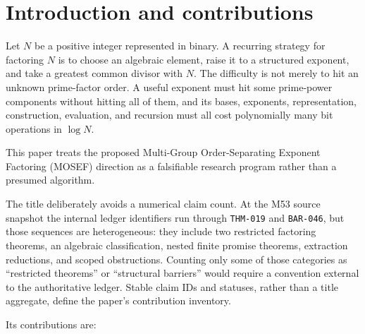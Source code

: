 \documentclass[11pt]{article}
\begin{document}
\section{Introduction and contributions}

Let \(N\) be a positive integer represented in binary. A recurring strategy
for factoring \(N\) is to choose an algebraic element, raise it to a structured
exponent, and take a greatest common divisor with \(N\). The difficulty is not
merely to hit an unknown prime-factor order. A useful exponent must hit some
prime-power components without hitting all of them, and its bases, exponents,
representation, construction, evaluation, and recursion must all cost
polynomially many bit operations in \(\log N\).

This paper treats the proposed Multi-Group Order-Separating Exponent Factoring
(MOSEF) direction as a falsifiable research program rather than a presumed
algorithm.

The title deliberately avoids a numerical claim count. At the M53 source
snapshot the internal ledger identifiers run through \texttt{THM-019} and
\texttt{BAR-046}, but those sequences are heterogeneous: they include two
restricted factoring theorems, an algebraic classification, nested finite
promise theorems, extraction reductions, and scoped obstructions. Counting
only some of those categories as ``restricted theorems'' or ``structural
barriers'' would require a convention external to the authoritative ledger.
Stable claim IDs and statuses, rather than a title aggregate, define the
paper's contribution inventory.

Its contributions are:
\end{document}
